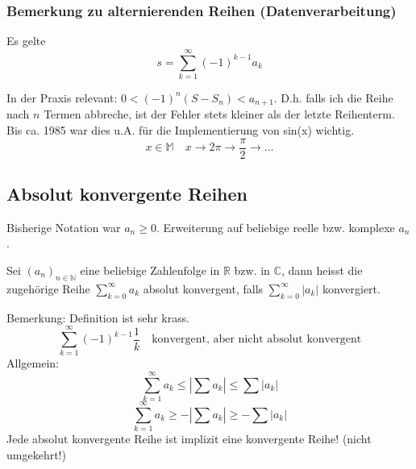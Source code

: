 \subsubsection{Bemerkung zu alternierenden Reihen (Datenverarbeitung)} %
\label{ssub:bemerkung_zu_alternierenden_reihen_datenverarbeitung_}
Es gelte \[ s=\sum_{k=1}^\infty (-1)^{k-1}a_k \] 

\noindent In der Praxis relevant: \( 0<(-1)^n(S-S_n) < a_{n+1} \). D.h. falls ich die Reihe nach \( n \) Termen abbreche, ist der Fehler stets kleiner als der letzte Reihenterm. Bis ca. 1985 war dies u.A. für die Implementierung von sin(x) wichtig.
\[
	x \in \mathbb{M} \quad x \rightarrow 2\pi \rightarrow \frac{\pi}{2} \rightarrow \ldots
\]


\subsection{Absolut konvergente Reihen} %
\label{sub:absolut_konvergente_reihen}

Bisherige Notation war \( a_n \geq 0 \). Erweiterung auf beliebige reelle bzw. komplexe \( a_n \). 

\begin{definition}
	Sei \( (a_n)_{n\in\mathbb{N}} \) eine beliebige Zahlenfolge in \( \mathbb{R} \) bzw. in \( \mathbb{C} \), dann heisst die zugehörige Reihe \( \sum_{k=0}^\infty a_k \) absolut konvergent, falls \( \sum_{k=0}^\infty |a_k| \) konvergiert.
\end{definition}

\noindent Bemerkung: Definition ist sehr krass.
\[
	\sum_{k=1}^\infty(-1)^{k-1}\frac{1}{k} \quad \text{konvergent, aber nicht absolut konvergent}
\]
Allgemein:
\[
	\sum_{k=1}^\infty a_k\leq|\sum a_k| \leq \sum|a_k|
\]
\[
	\sum_{k=1}^\infty a_k\geq-|\sum a_k| \geq -\sum|a_k|
\]
\noindent Jede absolut konvergente Reihe ist implizit eine konvergente Reihe! (nicht umgekehrt!)

